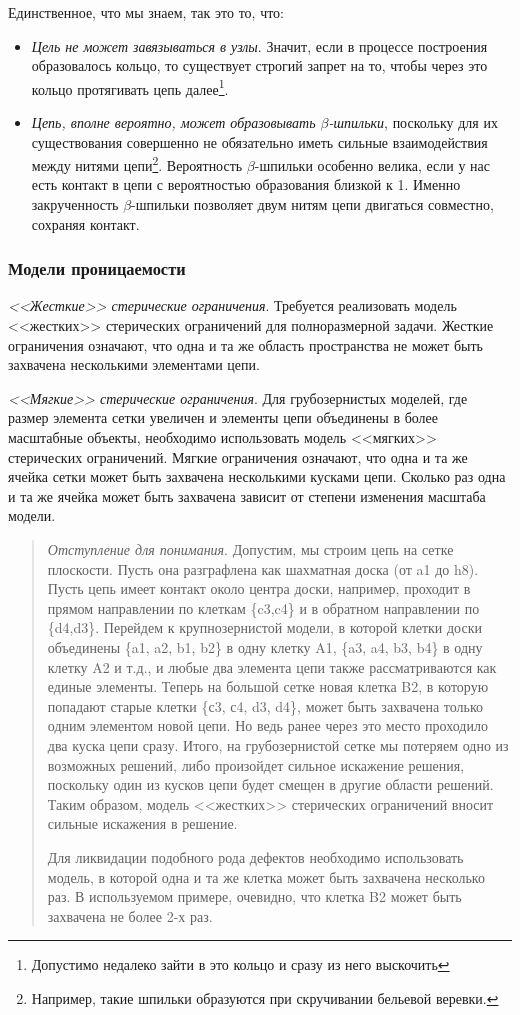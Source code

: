 \documentclass[tikz,a4paper]{scrartcl} %
\begin{document}
Единственное, что мы знаем, так это то, что:
\begin{itemize}
\item \textit{Цель не может завязываться в узлы}. Значит, если в процессе построения образовалось кольцо, то существует строгий запрет на то, чтобы через это кольцо протягивать цепь далее\footnote{Допустимо недалеко зайти в это кольцо и сразу из него выскочить}.
\item \textit{Цепь, вполне вероятно, может образовывать $\beta$-шпильки}, поскольку для их существования совершенно не обязательно иметь сильные взаимодействия между нитями цепи\footnote{Например, такие шпильки образуются при скручивании бельевой веревки.}. Вероятность $\beta$-шпильки особенно велика, если у нас есть контакт в цепи с вероятностью образования близкой к 1. Именно закрученность $\beta$-шпильки позволяет двум нитям цепи двигаться совместно, сохраняя контакт.
\end{itemize} 

\subsubsection*{Модели проницаемости}
\textit{<<Жесткие>> стерические ограничения}. Требуется реализовать модель <<жестких>> стерических ограничений для полноразмерной задачи. Жесткие ограничения означают, что одна и та же область пространства не может быть захвачена несколькими элементами цепи.

\textit{<<Мягкие>> стерические ограничения}. Для грубозернистых моделей, где размер элемента сетки увеличен и элементы цепи объединены в более масштабные объекты, необходимо использовать модель <<мягких>> стерических ограничений. Мягкие ограничения означают, что одна и та же ячейка сетки может быть захвачена несколькими кусками цепи. Сколько раз одна и та же ячейка может быть захвачена зависит от степени изменения масштаба модели.

\begin{quote} \textit{Отступление для понимания}. 
Допустим, мы строим цепь на сетке плоскости. Пусть она разграфлена как шахматная доска (от a1 до h8). Пусть цепь имеет контакт около центра доски, например, проходит в прямом направлении по клеткам \{c3,c4\} и в обратном направлении по \{d4,d3\}. Перейдем к крупнозернистой модели, в которой клетки доски объединены \{a1, a2, b1, b2\} в одну клетку A1, \{a3, a4, b3, b4\} в одну клетку A2 и т.д., и любые два элемента цепи также рассматриваются как единые элементы. Теперь на большой сетке новая клетка B2, в которую попадают старые клетки \{с3, с4, d3, d4\}, может быть захвачена только одним элементом новой цепи. Но ведь ранее через это место проходило два куска цепи сразу. Итого, на грубозернистой сетке мы потеряем одно из возможных решений, либо произойдет сильное искажение решения, поскольку один из кусков цепи будет смещен в другие области решений. Таким образом, модель <<жестких>> стерических ограничений вносит сильные искажения в решение. 

Для ликвидации подобного рода дефектов необходимо использовать модель, в которой одна и та же клетка может быть захвачена несколько раз. В используемом примере, очевидно, что клетка B2 может быть захвачена не более 2-х раз.
\end{quote}
\end{document}
